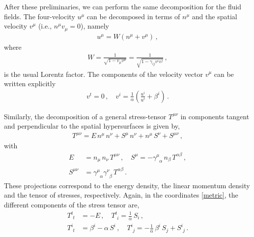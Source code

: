 \documentclass[prd,aps,twocolumn,floats,floatfix,nofootinbib,superscriptaddress] {revtex4-1}
\begin{document}
After these preliminaries, we can perform the same decomposition for the fluid fields. The four-velocity  $u^\mu$ can be decomposed in terms of $n^\mu$ and the spatial velocity $v^\mu$ (i.e., $n^\mu v_\mu=0$), namely
\begin{align}
u^\mu = W(n^\mu + v^\mu)\,,
\label{eq:def_u_A}
\end{align}
where
\begin{align}
W=\frac{1}{\sqrt{1-v_\mu v^\mu}} = \frac{1}{\sqrt{1-\gamma_{ij}v^i v^j}} \label{eq:def_W}\,,
\end{align}
is the usual Lorentz factor. The components of the velocity vector $v^\mu$ can be written explicitly 
\begin{align}
v^t=0\,,\quad v^i=\tfrac{1}{\alpha}\left(\tfrac{u^i}{u^t}+\beta^i\right)\,.
\end{align}

Similarly, the decomposition of a general stress-tensor $T^{\mu\nu}$ in components tangent and perpendicular to the spatial hypersurfaces is given by, 
\begin{align}
T^{\mu\nu} = E\,n^\mu\,n^\nu + S^\mu\,n^\nu + n^\mu\,S^\nu + S^{\mu\nu}\,,
\end{align}
with
\begin{align}
E &=n_\mu\,n_\nu\,T^{\mu\nu}\,,\quad S^\mu = -\gamma^\mu_{\phantom{\mu}\alpha}\,n_\beta\,T^{\alpha\beta}\,,\nonumber\\
 S^{\mu\nu} &= \gamma^\mu_{\phantom{\mu}\alpha}\gamma^\nu_{\phantom{\nu}\beta}\,T^{\alpha\beta}\,.
\label{eq:projections}
\end{align}
These projections correspond to the energy density, the linear momentum density and the tensor of stresses, respectively.
Again, in the coordinates \eqref{metric},  the different components of the stress tensor are,
\begin{align}
T^t_{\phantom{t}t} &= -E\,,\quad T^t_{\phantom{t}i} = \tfrac{1}{\alpha}\,S_i\,,\nonumber\\ T^i_{\phantom{i}t} &=\beta^i-\alpha\,S^i\,,\quad T^i_{\phantom{i}j} = -\tfrac{1}{\alpha}\,\beta^i\,S_j+S^i_{\phantom{i}j}\,.
\end{align}
\end{document}

